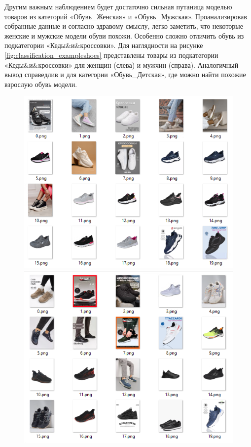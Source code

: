 \documentclass[a4paper,12pt]{extarticle}
\begin{document}
Другим важным наблюдением будет достаточно сильная путаница моделью товаров из категорий «Обувь\_Женская» и «Обувь\_Мужская». Проанализировав собранные данные и согласно здравому смыслу, легко заметить, что некоторые женские и мужские модели обуви похожи. Особенно сложно отличить обувь из подкатегории «Кеды\&и\&кроссовки». Для наглядности на рисунке \ref{fig:classification_exampleshoes} представлены товары из подкатегории «Кеды\&и\&кроссовки» для женщин (слева) и мужчин (справа). Аналогичный вывод справедлив и для категории «Обувь\_Детская», где можно найти похожие взрослую обувь модели.

\begin{figure}[ht]
	\centering
	\begin{minipage}[b]{3in}
		\includegraphics[scale=0.5]{classification/classification_exampleshoes1.png}
	\end{minipage}
	\hfill
	\begin{minipage}[b]{3in}
		\includegraphics[scale=0.5]{classification/classification_exampleshoes2.png}

\end{minipage}
\end{figure}
\end{document}
